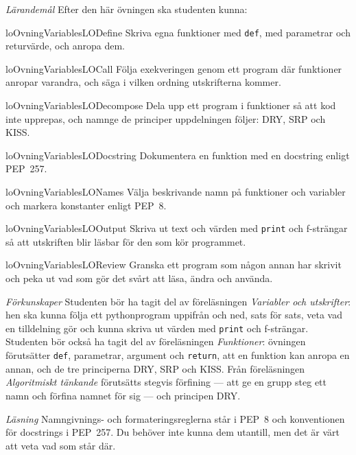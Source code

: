 \emph{Lärandemål}
Efter den här övningen ska studenten kunna:
\begin{restatable}{lo}{OvningVariablesLODefine}\label{OvningVariablesLODefine}%
  Skriva egna funktioner med \texttt{def}, med parametrar och
  returvärde, och anropa dem.
\end{restatable}
\begin{restatable}{lo}{OvningVariablesLOCall}\label{OvningVariablesLOCall}%
  Följa exekveringen genom ett program där funktioner anropar varandra,
  och säga i vilken ordning utskrifterna kommer.
\end{restatable}
\begin{restatable}{lo}{OvningVariablesLODecompose}%
  \label{OvningVariablesLODecompose}%
  Dela upp ett program i funktioner så att kod inte upprepas, och namnge
  de principer uppdelningen följer: DRY, SRP och KISS.
\end{restatable}
\begin{restatable}{lo}{OvningVariablesLODocstring}%
  \label{OvningVariablesLODocstring}%
  Dokumentera en funktion med en
  \foreignlanguage{english}{docstring} enligt PEP~257.
\end{restatable}
\begin{restatable}{lo}{OvningVariablesLONames}\label{OvningVariablesLONames}%
  Välja beskrivande namn på funktioner och variabler och markera
  konstanter enligt PEP~8.
\end{restatable}
\begin{restatable}{lo}{OvningVariablesLOOutput}\label{OvningVariablesLOOutput}%
  Skriva ut text och värden med \texttt{print} och
  f-strängar så att utskriften blir läsbar för den som kör
  programmet.
\end{restatable}
\begin{restatable}{lo}{OvningVariablesLOReview}\label{OvningVariablesLOReview}%
  Granska ett program som någon annan har skrivit och peka ut vad som gör
  det svårt att läsa, ändra och använda.
\end{restatable}

\emph{Förkunskaper}
Studenten bör ha tagit del av föreläsningen \emph{Variabler och
utskrifter}: hen ska kunna följa ett pythonprogram uppifrån och ned, sats
för sats, veta vad en tilldelning gör och kunna skriva ut värden med
\texttt{print} och f-strängar.  Studenten bör också ha tagit
del av föreläsningen \emph{Funktioner}: övningen förutsätter
\texttt{def}, parametrar, argument och
\texttt{return}, att en funktion kan anropa en annan,
och de tre principerna DRY, SRP och KISS.
Från föreläsningen \emph{Algoritmiskt tänkande} förutsätts stegvis
förfining --- att ge en grupp steg ett namn och förfina namnet för sig ---
och principen DRY.

\emph{Läsning}
Namngivnings- och formateringsreglerna står i PEP~8\autocite{pep8} och
konventionen för \foreignlanguage{english}{docstrings} i
PEP~257\autocite{pep257}.  Du behöver inte kunna dem utantill, men det är
värt att veta vad som står där.
